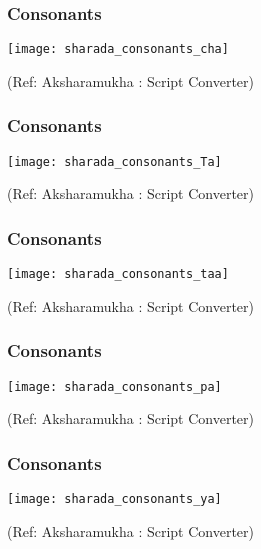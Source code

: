 \begin{frame}[fragile]\frametitle{Consonants}

	\begin{center}
	\texttt{[image: sharada\_consonants\_cha]} 
	
	{\tiny (Ref: Aksharamukha : Script Converter)}
	\end{center}	

\end{frame}

\begin{frame}[fragile]\frametitle{Consonants}

	\begin{center}
	\texttt{[image: sharada\_consonants\_Ta]} 
	
	{\tiny (Ref: Aksharamukha : Script Converter)}
	\end{center}	

\end{frame}

\begin{frame}[fragile]\frametitle{Consonants}

	\begin{center}
	\texttt{[image: sharada\_consonants\_taa]} 
	
	{\tiny (Ref: Aksharamukha : Script Converter)}
	\end{center}	

\end{frame}

\begin{frame}[fragile]\frametitle{Consonants}

	\begin{center}
	\texttt{[image: sharada\_consonants\_pa]} 
	
	{\tiny (Ref: Aksharamukha : Script Converter)}
	\end{center}	

\end{frame}

\begin{frame}[fragile]\frametitle{Consonants}

	\begin{center}
	\texttt{[image: sharada\_consonants\_ya]} 
	
	{\tiny (Ref: Aksharamukha : Script Converter)}
	\end{center}	

\end{frame}

